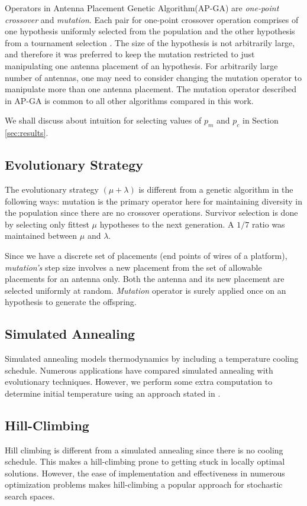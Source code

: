 \documentclass{sig-alternate}
\begin{document}
Operators in Antenna Placement Genetic Algorithm(AP-GA) are \textit{one-point crossover} and \textit{mutation}. Each pair for one-point crossover operation comprises of one hypothesis uniformly selected from the population and the other hypothesis from a tournament selection \cite{miller1995genetic}. The size of the hypothesis is not arbitrarily large, and therefore it was preferred to keep the mutation restricted to just manipulating one antenna placement of an hypothesis. For arbitrarily large number of antennas, one may need to consider changing the mutation operator to manipulate more than one antenna placement. The mutation operator described in AP-GA is common to all other algorithms compared in this work. 

We shall discuss about intuition for selecting values of $p_m$ and $p_c$ in Section \ref{sec:results}. 

\subsection{Evolutionary Strategy}
\label{seThe placement space is finite as we shall elaborate further in Section c:algorithms-es}
The evolutionary strategy $(\mu + \lambda)$ \cite{schwefel1977numerische, fogel1994introduction} is different from a genetic algorithm in the following ways: 
mutation is the primary operator here for maintaining diversity in the population since there are no crossover operations. Survivor selection is done by selecting only fittest $\mu$ hypotheses to the next generation. A $1/7$ ratio was maintained between $\mu$ and $\lambda$. 

Since we have a discrete set of placements (end points of wires of a platform), \textit{mutation's} step size involves a new placement from the set of allowable placements for an antenna only. Both the antenna and its new placement are selected uniformly at random. \textit{Mutation} operator is surely applied once on an hypothesis to generate the offspring.

\subsection{Simulated Annealing}
\label{sec:algoriths-sa}
Simulated annealing models thermodynamics by including a temperature cooling schedule. Numerous applications have compared simulated annealing with evolutionary techniques. However, we perform some extra computation to determine initial temperature using an approach stated in \cite{ben2004computing}.
\subsection{Hill-Climbing}
\label{sec:algoriths-hc}
Hill climbing is different from a simulated annealing since there is no cooling schedule. This makes a hill-climbing prone to getting stuck in locally optimal solutions. However, the ease of implementation and effectiveness in numerous optimization problems makes hill-climbing a popular approach for stochastic search spaces.  
\end{document}
